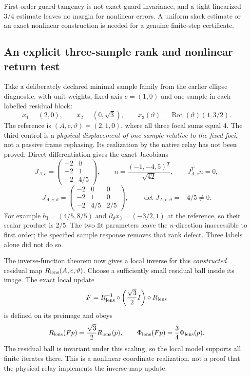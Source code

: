 \documentclass[11pt,a4paper]{article}
\begin{document}
First-order guard tangency is not exact guard invariance, and a
tight linearized $3/4$ estimate leaves no margin for nonlinear
errors. A uniform slack estimate or an exact nonlinear construction
is needed for a genuine finite-step certificate.

\subsection{An explicit three-sample rank and nonlinear return test}

Take a deliberately declared minimal sample family from the earlier
ellipse diagnostic, with unit weights, fixed axis $e=(1,0)$ and
one sample in each labelled residual block:
\[
 x_1=(2,0),\qquad x_2=(0,\sqrt3),\qquad
 x_3(\vartheta)=\operatorname{Rot}(\vartheta)(1,3/2).
\]
The reference is $(A,c,\vartheta)=(2,1,0)$, where all three focal
sums equal $4$. The third control is a \emph{physical displacement
of one sample relative to the fixed foci}, not a passive frame
rephasing. Its realization by the native relay has not been proved.
Direct differentiation gives the exact Jacobians
\[
 J_{A,c}=\begin{pmatrix}-2&0\\-2&1\\-2&4/5\end{pmatrix},
 \qquad n=\frac{(-1,-4,5)^T}{\sqrt{42}},
 \qquad J_{A,c}^Tn=0,
\]
\[
 J_{A,c,\vartheta}=
 \begin{pmatrix}-2&0&0\\-2&1&0\\-2&4/5&2/5\end{pmatrix},
 \qquad \det J_{A,c,\vartheta}=-4/5\ne0.
\]
For example $b_3=(4/5,8/5)$ and
$\partial_\vartheta x_3=(-3/2,1)$ at the reference, so their
scalar product is $2/5$. The two fit parameters leave the
$n$-direction inaccessible to first order; the specified sample
response removes that rank defect. Three labels alone did not do so.

The inverse-function theorem now gives a local inverse for this
\emph{constructed} residual map $R_{\rm lens}(A,c,\vartheta)$.
Choose a sufficiently small residual ball
inside its image. The exact local update
\[
 F=R_{\rm lens}^{-1}\circ
       \left(\frac{\sqrt3}{2}I\right)\circ R_{\rm lens}
\]
is defined on its preimage and obeys
\[
 R_{\rm lens}(Fp)=\frac{\sqrt3}{2}R_{\rm lens}(p),\qquad
 \Phi_{\rm lens}(Fp)=\frac34\Phi_{\rm lens}(p).
\]
The residual ball is invariant under this scaling, so the local
model supports all finite iterates there. This is a nonlinear
coordinate realization, not a proof that the physical relay
implements the inverse-map update.
\end{document}
